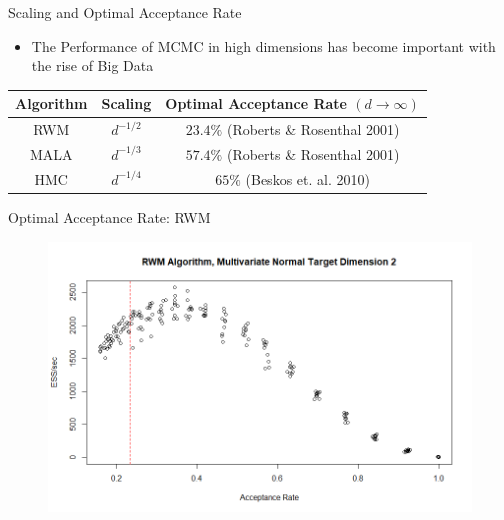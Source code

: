 \documentclass{beamer}
\begin{document}



\begin{frame}{Scaling and Optimal Acceptance Rate}

\begin{itemize}
\item The Performance of MCMC in high dimensions has become important with the rise of Big Data \vskip 5mm
\end{itemize}


\begin{table}
\centering
\begin{tabular}{|c||c|c|}
\hline
Algorithm & Scaling & Optimal Acceptance Rate $(d \to \infty)$ \\
\hline
RWM & $d^{-1/2}$ & $23.4\%$ (Roberts \& Rosenthal 2001) \\
MALA & $d^{-1/3}$ & $57.4\%$ (Roberts \& Rosenthal 2001) \\
HMC & $d^{-1/4}$ & $65\%$ (Beskos et. al. 2010) \\
\hline
\end{tabular}
\end{table}

\end{frame}


\begin{frame}{Optimal Acceptance Rate: RWM}

\begin{figure}
\centering
\includegraphics[scale = 0.4]{RWM_Optimal2.png}
\end{figure}

\end{frame}
\end{document}
